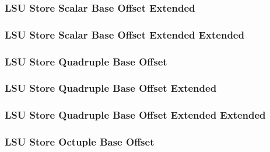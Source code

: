 \subsubsection[{\small LSU Store Scalar Base Offset Extended}]{LSU Store Scalar Base Offset Extended} \label{sec:format-LSU-SSBO.X}



\subsubsection[{\small LSU Store Scalar Base Offset Extended Extended}]{LSU Store Scalar Base Offset Extended Extended} \label{sec:format-LSU-SSBO.Y}



\subsubsection[{\small LSU Store Quadruple Base Offset}]{LSU Store Quadruple Base Offset} \label{sec:format-LSU-SQBO}



\subsubsection[{\small LSU Store Quadruple Base Offset Extended}]{LSU Store Quadruple Base Offset Extended} \label{sec:format-LSU-SQBO.X}



\subsubsection[{\small LSU Store Quadruple Base Offset Extended Extended}]{LSU Store Quadruple Base Offset Extended Extended} \label{sec:format-LSU-SQBO.Y}



\subsubsection[{\small LSU Store Octuple Base Offset}]{LSU Store Octuple Base Offset} \label{sec:format-LSU-SOBO}

